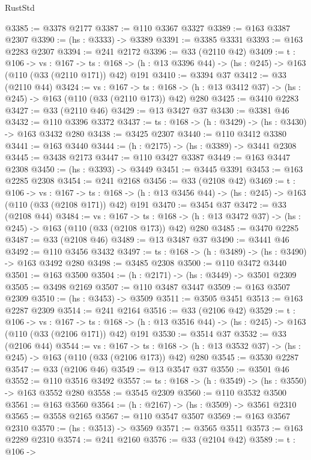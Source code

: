 \begin{lexlean}{RustStd}
\begin{coremodule}
@3385 := @3378 @2177
@3387 := @110 @3367 @3327
@3389 := @163 @3387 @2307
@3390 := (hs : @3333) -> @3389
@3391 := @3385 @3331
@3393 := @163 @2283 @2307
@3394 := @241 @2172
@3396 := @33 (@2110 @42)
@3409 := {t : @106} ->
  {vs : @167} ->
  {ts : @168} -> (h : @13 @3396 @44) -> (hs : @245) -> @163 (@110 (@33 (@2110 @171)) @42) @191
@3410 := @3394 @37
@3412 := @33 (@2110 @44)
@3424 := {vs : @167} ->
  {ts : @168} -> (h : @13 @3412 @37) -> (hs : @245) -> @163 (@110 (@33 (@2110 @173)) @42) @280
@3425 := @3410 @2283
@3427 := @33 (@2110 @46)
@3429 := @13 @3427 @37
@3430 := @3381 @46
@3432 := @110 @3396 @3372
@3437 := {ts : @168} -> (h : @3429) -> (hs : @3430) -> @163 @3432 @280
@3438 := @3425 @2307
@3440 := @110 @3412 @3380
@3441 := @163 @3440
@3444 := (h : @2175) -> (hs : @3389) -> @3441 @2308
@3445 := @3438 @2173
@3447 := @110 @3427 @3387
@3449 := @163 @3447 @2308
@3450 := (hs : @3393) -> @3449
@3451 := @3445 @3391
@3453 := @163 @2285 @2308
@3454 := @241 @2168
@3456 := @33 (@2108 @42)
@3469 := {t : @106} ->
  {vs : @167} ->
  {ts : @168} -> (h : @13 @3456 @44) -> (hs : @245) -> @163 (@110 (@33 (@2108 @171)) @42) @191
@3470 := @3454 @37
@3472 := @33 (@2108 @44)
@3484 := {vs : @167} ->
  {ts : @168} -> (h : @13 @3472 @37) -> (hs : @245) -> @163 (@110 (@33 (@2108 @173)) @42) @280
@3485 := @3470 @2285
@3487 := @33 (@2108 @46)
@3489 := @13 @3487 @37
@3490 := @3441 @46
@3492 := @110 @3456 @3432
@3497 := {ts : @168} -> (h : @3489) -> (hs : @3490) -> @163 @3492 @280
@3498 := @3485 @2308
@3500 := @110 @3472 @3440
@3501 := @163 @3500
@3504 := (h : @2171) -> (hs : @3449) -> @3501 @2309
@3505 := @3498 @2169
@3507 := @110 @3487 @3447
@3509 := @163 @3507 @2309
@3510 := (hs : @3453) -> @3509
@3511 := @3505 @3451
@3513 := @163 @2287 @2309
@3514 := @241 @2164
@3516 := @33 (@2106 @42)
@3529 := {t : @106} ->
  {vs : @167} ->
  {ts : @168} -> (h : @13 @3516 @44) -> (hs : @245) -> @163 (@110 (@33 (@2106 @171)) @42) @191
@3530 := @3514 @37
@3532 := @33 (@2106 @44)
@3544 := {vs : @167} ->
  {ts : @168} -> (h : @13 @3532 @37) -> (hs : @245) -> @163 (@110 (@33 (@2106 @173)) @42) @280
@3545 := @3530 @2287
@3547 := @33 (@2106 @46)
@3549 := @13 @3547 @37
@3550 := @3501 @46
@3552 := @110 @3516 @3492
@3557 := {ts : @168} -> (h : @3549) -> (hs : @3550) -> @163 @3552 @280
@3558 := @3545 @2309
@3560 := @110 @3532 @3500
@3561 := @163 @3560
@3564 := (h : @2167) -> (hs : @3509) -> @3561 @2310
@3565 := @3558 @2165
@3567 := @110 @3547 @3507
@3569 := @163 @3567 @2310
@3570 := (hs : @3513) -> @3569
@3571 := @3565 @3511
@3573 := @163 @2289 @2310
@3574 := @241 @2160
@3576 := @33 (@2104 @42)
@3589 := {t : @106} ->

\end{coremodule}
\end{lexlean}
